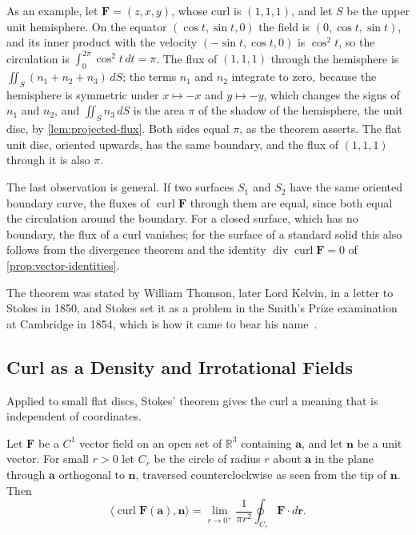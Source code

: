 As an example, let $\mathbf F=(z,x,y)$, whose curl is $(1,1,1)$, and let $S$ be the upper unit hemisphere. On the equator $(\cos t,\sin t,0)$ the field is $(0,\cos t,\sin t)$, and its inner product with the velocity $(-\sin t,\cos t,0)$ is $\cos^2t$, so the circulation is $\int_0^{2\pi}\cos^2t\,dt=\pi$. The flux of $(1,1,1)$ through the hemisphere is $\iint_S(n_1+n_2+n_3)\,dS$; the terms $n_1$ and $n_2$ integrate to zero, because the hemisphere is symmetric under $x\mapsto-x$ and $y\mapsto-y$, which changes the signs of $n_1$ and $n_2$, and $\iint_Sn_3\,dS$ is the area $\pi$ of the shadow of the hemisphere, the unit disc, by \cref{lem:projected-flux}. Both sides equal $\pi$, as the theorem asserts. The flat unit disc, oriented upwards, has the same boundary, and the flux of $(1,1,1)$ through it is also $\pi$.

The last observation is general. If two surfaces $S_1$ and $S_2$ have the same oriented boundary curve, the fluxes of $\operatorname{curl}\mathbf F$ through them are equal, since both equal the circulation around the boundary. For a closed surface, which has no boundary, the flux of a curl vanishes; for the surface of a standard solid this also follows from the divergence theorem and the identity $\operatorname{div}\operatorname{curl}\mathbf F=0$ of \cref{prop:vector-identities}.

The theorem was stated by William Thomson, later Lord Kelvin, in a letter to Stokes in 1850, and Stokes set it as a problem in the Smith's Prize examination at Cambridge in 1854, which is how it came to bear his name~\cite{katz1979}.

\subsection{Curl as a Density and Irrotational Fields}

Applied to small flat discs, Stokes' theorem gives the curl a meaning that is independent of coordinates.

\begin{proposition}
\label{prop:curl-limit}
Let $\mathbf F$ be a $C^1$ vector field on an open set of $\mathbb R^3$ containing $\mathbf a$, and let $\mathbf n$ be a unit vector. For small $r>0$ let $C_r$ be the circle of radius $r$ about $\mathbf a$ in the plane through $\mathbf a$ orthogonal to $\mathbf n$, traversed counterclockwise as seen from the tip of $\mathbf n$. Then
\[
\bigl\langle\operatorname{curl}\mathbf F(\mathbf a),\mathbf n\bigr\rangle=\lim_{r\to0^+}\frac1{\pi r^2}\oint_{C_r}\mathbf F\cdot d\mathbf r .
\]
\end{proposition}


